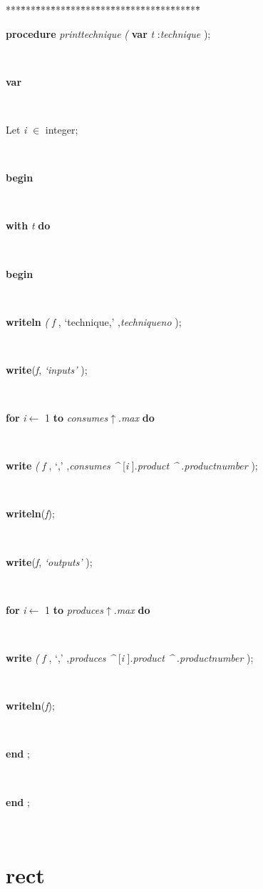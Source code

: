 \begin{tabbing}
***\=***\=***\=***\=***\=***\=***\=***\=***\=***\=***\=***\=***\=\kill
\parbox{14cm}{\textsf{\textbf{procedure}  \textit{printtechnique} \textit{(} \textbf{var}  \textit{t} :\textit{technique} );}}\\
\+\parbox{14cm}{\textsf{\textbf{var} }}\\
\parbox{14cm}{\textsf{Let \textit{i} $\in$ integer;}}\\
\-\<\+\parbox{14cm}{\textsf{\textbf{begin} }}\\
\+\parbox{14cm}{\textsf {\textbf {with } \textsf{\textit{t}} \textbf{ do } }}\\
\<\parbox{14cm}{\textsf{\textbf{begin} }}\\
\parbox{14cm}{\textsf{\textbf{writeln} \textit{(} \textit{f} ,\textrm{\textup { `technique,' } },\textit{techniqueno} );}}\\
\parbox{14cm}{\textsf{\textbf{write}(\textit{f}, \textit{\textrm{\textup { `inputs' } }})}; }\\
\+\parbox{14cm}{\textsf {\textbf {for } \textsf{\textit{i}$\leftarrow$ 1} \textbf{ to } \textsf{\textit{consumes}$\uparrow$.\textit{max}} \textbf{ do } }}\\
\-\parbox{14cm}{\textsf{\textbf{write} \textit{(} \textit{f} ,\textrm{\textup { `,' } },\textit{consumes} \textit{\^{}} [\textit{i} ].\textit{product} \textit{\^{}} .\textit{productnumber} );}}\\
\parbox{14cm}{\textsf{\textbf{writeln}(\textit{f})}; }\\
\parbox{14cm}{\textsf{\textbf{write}(\textit{f}, \textit{\textrm{\textup { `outputs' } }})}; }\\
\+\parbox{14cm}{\textsf {\textbf {for } \textsf{\textit{i}$\leftarrow$ 1} \textbf{ to } \textsf{\textit{produces}$\uparrow$.\textit{max}} \textbf{ do } }}\\
\-\parbox{14cm}{\textsf{\textbf{write} \textit{(} \textit{f} ,\textrm{\textup { `,' } },\textit{produces} \textit{\^{}} [\textit{i} ].\textit{product} \textit{\^{}} .\textit{productnumber} );}}\\
\parbox{14cm}{\textsf{\textbf{writeln}(\textit{f})}; }\\
\<\-\parbox{14cm}{\textsf{\textbf{end} ;}}\\
\<\-\parbox{14cm}{\textsf{\textbf{end} ;}}\\
\end{tabbing}
\section{rect}\label{sec:technologies/logComplexrect}


